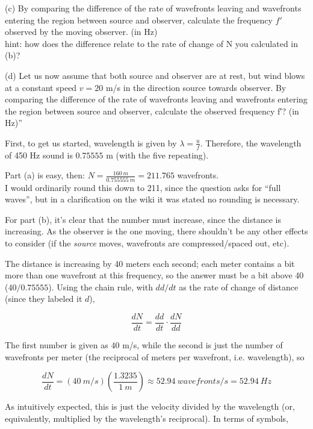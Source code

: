 \documentclass[8.01x]{subfiles}
\begin{document}
(c) By comparing the difference of the rate of wavefronts leaving and wavefronts entering the region between source and observer, calculate the frequency $f′$ observed by the moving observer. (in Hz)\\
hint: how does the difference relate to the rate of change of N you calculated in (b)?

(d) Let us now assume that both source and observer are at rest, but wind blows at a constant speed $v = 20$ m/s in the direction source towards observer. By comparing the difference of the rate of wavefronts leaving and wavefronts entering the region between source and observer, calculate the observed frequency f′? (in Hz)''

First, to get us started, wavelength is given by $\displaystyle \lambda = \frac{u}{f}$. Therefore, the wavelength of 450 Hz sound is $0.75555$ m (with the five repeating).

Part (a) is easy, then: $\displaystyle N = \frac{\SI{160}{m}}{\SI{0.755555}{m}} = 211.765$ wavefronts.\\
I would ordinarily round this down to 211, since the question asks for ``full waves'', but in a clarification on the wiki it was stated no rounding is necessary.

For part (b), it's clear that the number must increase, since the distance is increasing. As the observer is the one moving, there shouldn't be any other effects to consider (if the \emph{source} moves, wavefronts are compressed/spaced out, etc).

The distance is increasing by 40 meters each second; each meter contains a bit more than one wavefront at this frequency, so the answer must be a bit above 40 ($40/0.75555$). Using the chain rule, with $dd/dt$ as the rate of change of distance (since they labeled it $d$),

\begin{equation}
\frac{dN}{dt} = \frac{dd}{dt} \cdot \frac{dN}{dd}
\end{equation}

The first number is given as $40$ m/s, while the second is just the number of wavefronts per meter (the reciprocal of meters per wavefront, i.e. wavelength), so

\begin{equation}
\frac{dN}{dt} = (\SI{40}{m/s})(\frac{1.3235}{\SI{1}{m}}) \approx \SI{52.94}{wavefronts/s} = \SI{52.94}{Hz}
\end{equation}

As intuitively expected, this is just the velocity divided by the wavelength (or, equivalently, multiplied by the wavelength's reciprocal). In terms of symbols,
\end{document}
